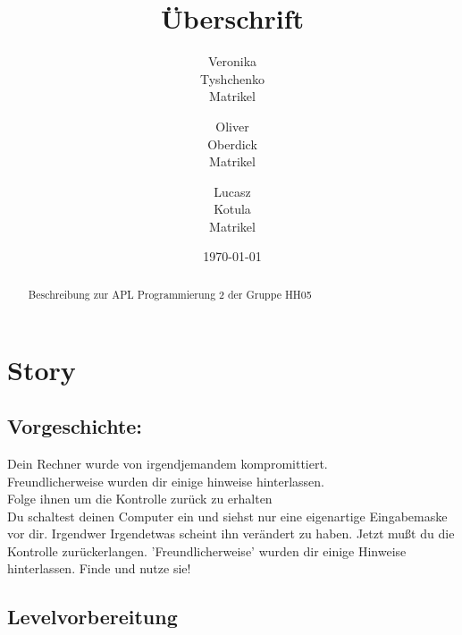 \documentclass[a4paper 11pt]{article}
\title{\textbf{Überschrift}} %
\author{Veronika\\Tyshchenko\\Matrikel \and Oliver\\Oberdick\\Matrikel \and Lucasz\\Kotula\\Matrikel } %
\date{\today} %
\begin{document}
\maketitle

\begin{abstract}
\begin{center}
Beschreibung zur APL Programmierung 2 der Gruppe HH05
\end{center}
\end{abstract}

\tableofcontents

\thispagestyle{empty}

\newpage
\pagestyle{plain}
\normalsize

\setcounter{page}{1} %

\section{Story}

\subsection{Vorgeschichte:}
Dein Rechner wurde von irgendjemandem kompromittiert. \\
Freundlicherweise wurden dir einige hinweise hinterlassen. \\
Folge ihnen um die Kontrolle zurück zu erhalten \\

Du schaltest deinen Computer ein und siehst nur eine eigenartige Eingabemaske vor dir.
Irgendwer \/ Irgendetwas scheint ihn verändert zu haben.
Jetzt mußt du die Kontrolle zurückerlangen. 'Freundlicherweise' wurden dir einige Hinweise
hinterlassen.
Finde und nutze sie!

\subsection{Levelvorbereitung}
\end{document}
